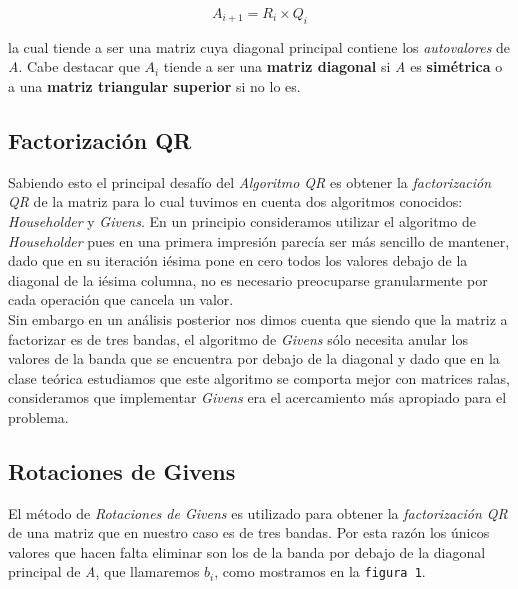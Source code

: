 \documentclass[a4paper]{article}
\begin{document}
$$A_{i + 1} = R_i \times Q_i$$

la cual tiende a ser una matriz cuya diagonal principal contiene los \textit{autovalores} de \textit{A}. Cabe destacar que $A_i$ tiende a ser una \textbf{matriz diagonal} si \textit{A} es \textbf{simétrica} o a una \textbf{matriz triangular superior} si no lo es.\\

\subsection{Factorización QR}
Sabiendo esto el principal desafío del \textit{Algoritmo QR} es obtener la \textit{factorización QR} de la matriz para lo cual tuvimos en cuenta dos algoritmos conocidos: \textit{Householder} y \textit{Givens}.
En un principio consideramos utilizar el algoritmo de \textit{Householder} pues en una primera impresión parecía ser más sencillo de mantener, dado que en su iteración iésima pone en cero todos los valores debajo de la diagonal de la iésima columna, no es necesario preocuparse granularmente por cada operación que cancela un valor.\\
Sin embargo en un análisis posterior nos dimos cuenta que siendo que la matriz a factorizar es de tres bandas, el algoritmo de \textit{Givens} sólo necesita anular los valores de la banda que se encuentra por debajo de la diagonal y dado que en la clase teórica estudiamos que este algoritmo se comporta mejor con matrices ralas, consideramos que implementar \textit{Givens} era el acercamiento más apropiado para el problema.

\subsection{Rotaciones de Givens}

El método de \textit{Rotaciones de Givens} es utilizado para obtener la \textit{factorización QR} de una matriz que en nuestro caso es de tres bandas. Por esta razón los únicos valores que hacen falta eliminar son los de la banda por debajo de la diagonal principal de \textit{A}, que llamaremos $b_i$, como mostramos en la \texttt{figura 1}.
\end{document}
